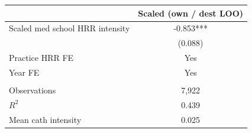
\begin{tabular}{lc}
\toprule
 & Scaled (own / dest LOO)\\
\midrule
Scaled med school HRR intensity & -0.853***\\
 & (0.088)\\
\addlinespace
Practice HRR FE & Yes\\
Year FE & Yes\\
\midrule\\
Observations & 7,922\\
$R^2$ & 0.439\\
Mean cath intensity & 0.025\\
\bottomrule
\end{tabular}
